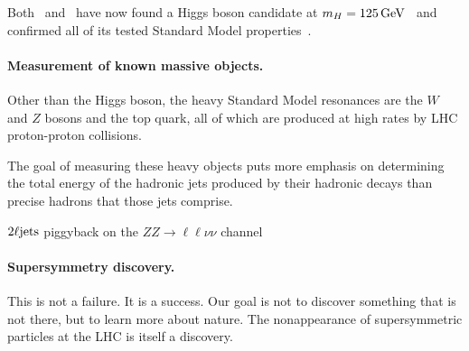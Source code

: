 Both \atlas\ and \cms\ have now found a Higgs boson candidate at
$m_H = 125\,\eV[G]$~\cite{
atlas2012higgs,
atlas2012combined,
cms2012higgs
}
and confirmed all of its tested Standard Model properties~\cite{
combined2016higgs,
atlas2022ten,
cms2022ten
}.

\paragraph{Measurement of known massive objects.}


Other than the Higgs boson, the heavy Standard Model resonances are the
$W$ and $Z$ bosons and the top quark, all of which are produced at
high rates by LHC proton-proton collisions.

The goal of measuring these heavy objects puts more emphasis on determining
the total energy of the hadronic jets produced by their hadronic decays
than precise hadrons that those jets comprise.









$\twoljets$ piggyback on the $ZZ \to \ell\ell\nu\nu$ channel



\paragraph{Supersymmetry discovery.}
This is not a failure. It is a success.
Our goal is not to discover something that is not there, but to learn more
about nature.
The nonappearance of supersymmetric particles at the LHC is itself a discovery.

